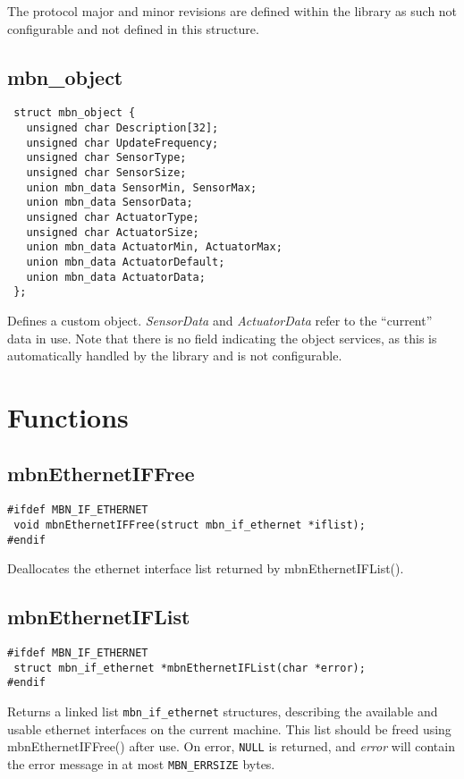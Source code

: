 \documentclass[a4paper]{report}
\begin{document}
The protocol major and minor revisions are defined within the library as such not configurable and not defined in this structure.


\subsection{mbn\_object}
\begin{verbatim}
 struct mbn_object {
   unsigned char Description[32];
   unsigned char UpdateFrequency;
   unsigned char SensorType;
   unsigned char SensorSize;
   union mbn_data SensorMin, SensorMax;
   union mbn_data SensorData;
   unsigned char ActuatorType;
   unsigned char ActuatorSize;
   union mbn_data ActuatorMin, ActuatorMax;
   union mbn_data ActuatorDefault;
   union mbn_data ActuatorData;
 };
\end{verbatim}
Defines a custom object. \textit{SensorData} and \textit{ActuatorData} refer to the ``current'' data in use. Note that there is no field indicating the object services, as this is automatically handled by the library and is not configurable.



\cleardoublepage
\section{Functions}
\subsection{mbnEthernetIFFree}
\begin{verbatim}
#ifdef MBN_IF_ETHERNET
 void mbnEthernetIFFree(struct mbn_if_ethernet *iflist);
#endif
\end{verbatim}
Deallocates the ethernet interface list returned by mbnEthernetIFList().


\subsection{mbnEthernetIFList}
\begin{verbatim}
#ifdef MBN_IF_ETHERNET
 struct mbn_if_ethernet *mbnEthernetIFList(char *error);
#endif
\end{verbatim}
Returns a linked list \verb|mbn_if_ethernet| structures, describing the available and usable ethernet interfaces on the current machine. This list should be freed using mbnEthernetIFFree() after use. On error, \verb|NULL| is returned, and \textit{error} will contain the error message in at most \verb|MBN_ERRSIZE| bytes.
\end{document}
